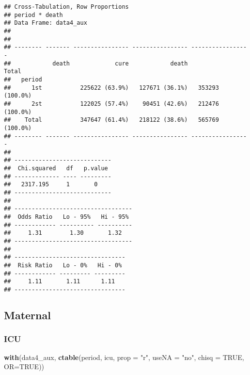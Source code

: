 \documentclass[
]{article}
\newenvironment{Shaded}{\begin{snugshade}}{\end{snugshade}}
\newcommand{\DataTypeTok}[1]{\textcolor[rgb]{0.13,0.29,0.53}{#1}}
\newcommand{\KeywordTok}[1]{\textcolor[rgb]{0.13,0.29,0.53}{\textbf{#1}}}
\newcommand{\NormalTok}[1]{#1}
\newcommand{\OperatorTok}[1]{\textcolor[rgb]{0.81,0.36,0.00}{\textbf{#1}}}
\newcommand{\OtherTok}[1]{\textcolor[rgb]{0.56,0.35,0.01}{#1}}
\newcommand{\StringTok}[1]{\textcolor[rgb]{0.31,0.60,0.02}{#1}}
\begin{document}
\begin{verbatim}
## Cross-Tabulation, Row Proportions  
## period * death  
## Data Frame: data4_aux  
## 
## 
## -------- ------- ---------------- ---------------- -----------------
##            death             cure            death             Total
##   period                                                            
##      1st           225622 (63.9%)   127671 (36.1%)   353293 (100.0%)
##      2st           122025 (57.4%)    90451 (42.6%)   212476 (100.0%)
##    Total           347647 (61.4%)   218122 (38.6%)   565769 (100.0%)
## -------- ------- ---------------- ---------------- -----------------
## 
## ----------------------------
##  Chi.squared   df   p.value 
## ------------- ---- ---------
##   2317.195     1       0    
## ----------------------------
## 
## ----------------------------------
##  Odds Ratio   Lo - 95%   Hi - 95% 
## ------------ ---------- ----------
##     1.31        1.30       1.32   
## ----------------------------------
## 
## --------------------------------
##  Risk Ratio   Lo - 0%   Hi - 0% 
## ------------ --------- ---------
##     1.11       1.11      1.11   
## --------------------------------
\end{verbatim}

\hypertarget{maternal-3}{%
\subsection{Maternal}\label{maternal-3}}

\begin{Shaded}
\end{Shaded}

\hypertarget{icu-2}{%
\subsubsection{ICU}\label{icu-2}}

\begin{Shaded}
\begin{Highlighting}[]
\KeywordTok{with}\NormalTok{(data4_aux, }\KeywordTok{ctable}\NormalTok{(period, icu, }\DataTypeTok{prop =} \StringTok{"r"}\NormalTok{, }\DataTypeTok{useNA =} \StringTok{"no"}\NormalTok{, }\DataTypeTok{chisq =} \OtherTok{TRUE}\NormalTok{, }\DataTypeTok{OR=}\OtherTok{TRUE}\NormalTok{))}
\end{Highlighting}
\end{Shaded}
\end{document}
